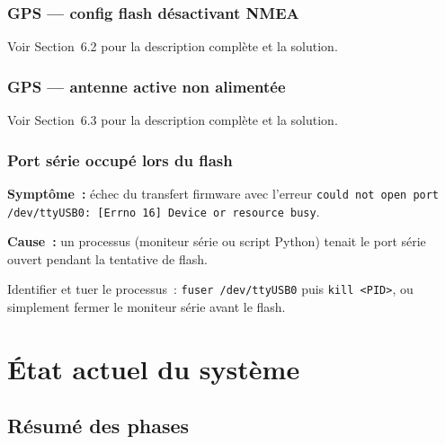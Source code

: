 \documentclass[12pt,a4paper]{article}
\begin{document}
\subsubsection{GPS — config flash désactivant NMEA}

Voir Section~6.2 pour la description complète et la solution.

\subsubsection{GPS — antenne active non alimentée}

Voir Section~6.3 pour la description complète et la solution.

\subsubsection{Port série occupé lors du flash}

\begin{warningbox}
  \textbf{Symptôme~:} échec du transfert firmware avec l'erreur
  \texttt{could not open port /dev/ttyUSB0: [Errno 16] Device or resource busy}.

  \textbf{Cause~:} un processus (moniteur série ou script Python) tenait
  le port série ouvert pendant la tentative de flash.
\end{warningbox}

\begin{okbox}
  Identifier et tuer le processus~: \texttt{fuser /dev/ttyUSB0} puis
  \texttt{kill <PID>}, ou simplement fermer le moniteur série avant le flash.
\end{okbox}

\section{État actuel du système}

\subsection{Résumé des phases}
\end{document}
